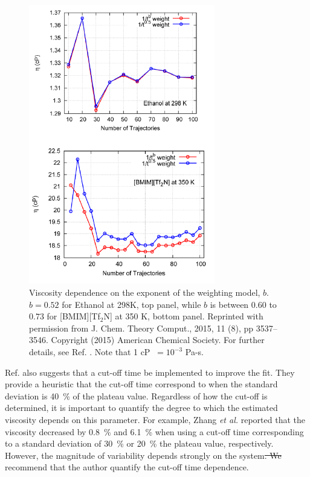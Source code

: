\documentclass[9pt,bestpractices]{livecoms}
\providecommand{\DIFadd}[1]{{\protect\color{blue}\uwave{#1}}} %
\providecommand{\DIFdel}[1]{{\protect\color{red}\sout{#1}}}                      %
\providecommand{\DIFaddbegin}{} %
\providecommand{\DIFaddend}{} %
\providecommand{\DIFdelbegin}{} %
\providecommand{\DIFdelend}{} %
\begin{document}

\begin{figure}[htb!]
	\centering
	\includegraphics[width=3.2in]{ZhangFig7_12.png}
	\caption{Viscosity dependence on the exponent of the weighting model, $b$. $b = 0.52$ for Ethanol at 298K, top panel, while $b$ is between $0.60$ to $0.73$ for [BMIM][Tf$_2$N] at 350 K, bottom panel. Reprinted with permission from J. Chem. Theory Comput., 2015, 11 (8), pp 3537–3546. Copyright (2015) American Chemical Society. For further details, see Ref. \cite{Zhang2015}. Note that 1 cP $\ = 10^{-3}$ Pa-s.}
	\label{fig:ZhangFig7_12}
\end{figure}

Ref. \cite{Zhang2015} also suggests that a cut-off time be implemented to improve the fit. They provide a heuristic that the cut-off time correspond to when the standard deviation is 40~\% of the plateau value. Regardless of how the cut-off is determined, it is important to quantify the degree to which the estimated viscosity depends on this parameter. For example, Zhang \textit{et al.} reported that the viscosity decreased by 0.8~\% and 6.1~\% when using a cut-off time corresponding to a standard deviation of 30~\% or 20~\% the plateau value, respectively. However, \DIFaddbegin \DIFadd{since }\DIFaddend the magnitude of variability depends strongly on the system\DIFdelbegin \DIFdel{. We }\DIFdelend \DIFaddbegin \DIFadd{, we }\DIFaddend recommend that the author quantify the cut-off time dependence.
\end{document}
